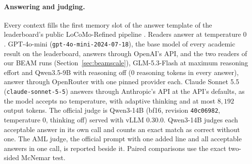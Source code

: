 \documentclass{article}
\begin{document}
\paragraph{Answering and judging.} Every context fills the first memory slot of the answer template of the leaderboard's public LoCoMo-Refined pipeline \cite{aml}. Readers answer at temperature $0$. GPT-4o-mini (\texttt{gpt-4o-mini-2024-07-18}), the base model of every academic result on the leaderboard, answers through OpenAI's API, and the two readers of our BEAM runs (Section~\ref{sec:beamscale}), GLM-5.3-Flash at maximum reasoning effort and Qwen3.5-9B with reasoning off ($0$ reasoning tokens in every answer), answer through OpenRouter with one pinned provider each. Claude Sonnet 5.5 (\texttt{claude-sonnet-5-5}) answers through Anthropic's API at the API's defaults, as the model accepts no temperature, with adaptive thinking and at most $8{,}192$ output tokens. The official judge is Qwen3-14B (bf16, revision \texttt{40c06982}, temperature $0$, thinking off) served with vLLM 0.30.0. Qwen3-14B judges each acceptable answer in its own call and counts an exact match as correct without one. The AML judge, the official prompt with one added line and all acceptable answers in one call, is reported beside it. Paired comparisons use the exact two-sided McNemar test.
\end{document}
